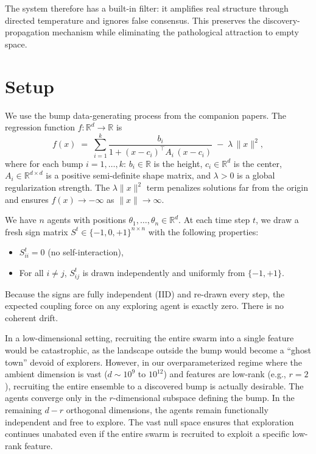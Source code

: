 \documentclass{article}
\begin{document}
The system therefore has a built-in filter: it amplifies real structure
through directed temperature and ignores false consensus. This preserves the discovery-propagation mechanism while eliminating the pathological
attraction to empty space.

\section{Setup}

We use the bump data-generating process from the companion papers. The
regression function $f \colon \mathbb{R}^d \to \mathbb{R}$ is
\begin{equation}\label{eq:dgp}
  f(x) \;=\; \sum_{i=1}^{k} \frac{b_i}{1 + (x - c_i)^\top A_i\,(x - c_i)}
  \;-\; \lambda\,\|x\|^2,
\end{equation}
where for each bump $i = 1, \dots, k$: $b_i \in \mathbb{R}$ is the height,
$c_i \in \mathbb{R}^d$ is the center,
$A_i \in \mathbb{R}^{d \times d}$ is a positive semi-definite shape matrix,
and $\lambda > 0$ is a global regularization strength. The
$\lambda\|x\|^2$ term penalizes solutions far from the origin and
ensures $f(x) \to -\infty$ as $\|x\| \to \infty$.

We have $n$ agents with positions
$\theta_1, \dots, \theta_n \in \mathbb{R}^d$. At each time step $t$, we draw
a fresh sign matrix $S^t \in \{-1, 0, +1\}^{n \times n}$ with the following
properties:
\begin{itemize}
  \item $S_{ii}^t = 0$ (no self-interaction),
  \item For all $i \neq j$, $S_{ij}^t$ is drawn independently and uniformly from $\{-1, +1\}$.
\end{itemize}
Because the signs are fully independent (IID) and re-drawn every step, the expected coupling force on any exploring agent is exactly zero. There is no coherent drift.

In a low-dimensional setting, recruiting the entire swarm into a single feature would be catastrophic, as the landscape outside the bump would become a ``ghost town'' devoid of explorers. However, in our overparameterized regime where the ambient dimension is vast ($d \sim 10^9$ to $10^{12}$) and features are low-rank (e.g., $r = 2$), recruiting the entire ensemble to a discovered bump is actually desirable. The agents converge only in the $r$-dimensional subspace defining the bump. In the remaining $d - r$ orthogonal dimensions, the agents remain functionally independent and free to explore. The vast null space ensures that exploration continues unabated even if the entire swarm is recruited to exploit a specific low-rank feature.
\end{document}
